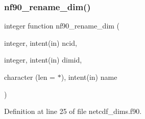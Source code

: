\mbox{\label{netcdf__dims_8f90_a695b95a284f7281f482646477e0f3841}} 
\subsubsection{\texorpdfstring{nf90\+\_\+rename\+\_\+dim()}{nf90\_rename\_dim()}}
{\footnotesize\ttfamily integer function nf90\+\_\+rename\+\_\+dim (\begin{DoxyParamCaption}\item[{integer, intent(in)}]{ncid,  }\item[{integer, intent(in)}]{dimid,  }\item[{character (len = $\ast$), intent(in)}]{name }\end{DoxyParamCaption})}



Definition at line 25 of file netcdf\+\_\+dims.\+f90.

